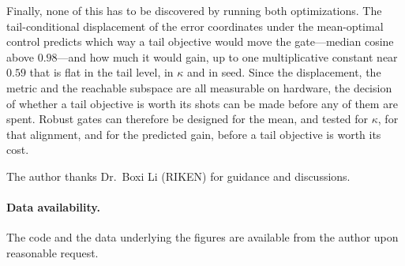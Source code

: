 \documentclass[aps,pra,twocolumn,superscriptaddress,reprint,nofootinbib,floatfix]{revtex4-2}
\theoremstyle{definition}
\begin{document}
Finally, none of this has to be discovered by running both optimizations. The
tail-conditional displacement of the error coordinates under the mean-optimal
control predicts which way a tail objective would move the gate---median
cosine above $0.98$---and how much it would gain, up to one multiplicative
constant near $0.59$ that is flat in the tail level, in $\kappa$ and in seed.
Since the displacement, the metric and the reachable subspace are all
measurable on hardware, the decision of whether a tail objective is worth its
shots can be made before any of them are spent. Robust gates can therefore be
designed for the mean, and tested for $\kappa$, for that alignment, and for
the predicted gain, before a tail objective is worth its cost.

\begin{acknowledgments}
The author thanks Dr.\ Boxi Li (RIKEN) for guidance and discussions.
\end{acknowledgments}

\paragraph*{Data availability.} The code and the data underlying the figures
are available from the author upon reasonable request.
\end{document}
